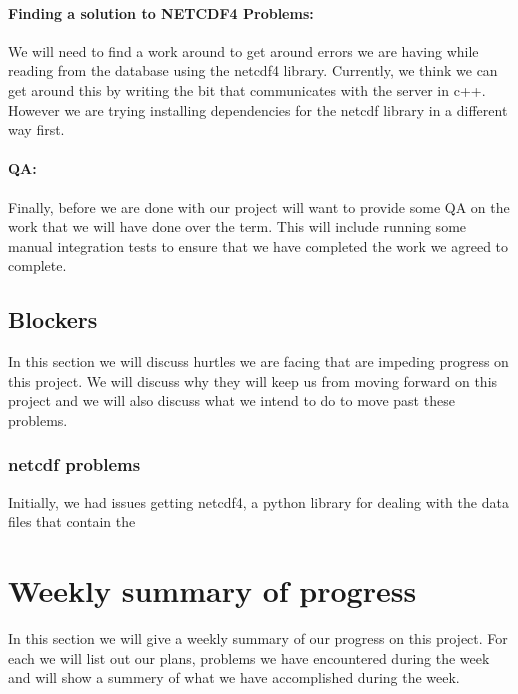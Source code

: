 \documentclass[onecolumn, draftclsnofoot,10pt, compsoc]{article}
\begin{document}
			\paragraph{Finding a solution to NETCDF4 Problems:} We will need to find a work around to get around errors we are having while reading from the database using the netcdf4 library. Currently, we think we can get around this by writing the bit that communicates with the server in c++. However we are trying installing dependencies for the netcdf library in a different way first.\\

			\paragraph{QA:} Finally, before we are done with our project will want to provide some QA on the work that we will have done over the term. This will include running some manual integration tests to ensure that we have completed the work we agreed to complete.\\

	\subsection{Blockers}
	    In this section we will discuss hurtles we are facing that are impeding progress on this project. We will discuss why they will keep us from moving forward on this project and we will also discuss what we intend to do to move past these problems.\\

			\subsubsection{netcdf problems}
			Initially, we had issues getting netcdf4, a python library for dealing with the data files that contain the

\section{Weekly summary of progress}
	   In this section we will give a weekly summary of our progress on this project. For each we will list out our plans, problems we have encountered during the week and will show a summery of what we have accomplished during the week.\\
\end{document}
